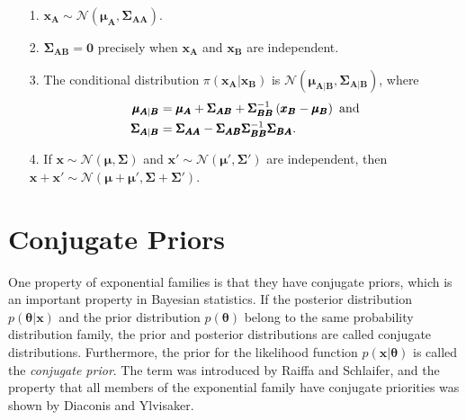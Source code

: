 \documentclass[12pt]{book}
\begin{document}
\begin{itemize}
    \item[1.] $\pmb{x}_{\pmb{A}}\sim\mathcal{N}\left(\pmb{\mu}_{\pmb{A}}, \pmb{\Sigma}_{\pmb{AA}}\right)$.
    \item[2.] $\pmb{\Sigma}_{\pmb{AB}}=\pmb{0}$ precisely when $\pmb{x}_{\pmb{A}}$ and $\pmb{x}_{\pmb{B}}$ are independent.
    \item[3.] The conditional distribution $\pi\left(\pmb{x}_{\pmb{A}}|\pmb{x}_{\pmb{B}}\right)$ is $\mathcal{N}\left(\pmb{\mu}_{\pmb{A}|\pmb{B}}, \pmb{\Sigma}_{\pmb{A}|\pmb{B}}\right)$, where
    \begin{align*}
        \pmb{\mu}_{\pmb{A}|\pmb{B}} &= \pmb{\mu}_{\pmb{A}}+\pmb{\Sigma}_{\pmb{AB}}+\pmb{\Sigma}_{\pmb{BB}}^{-1}\left(\pmb{x}_{\pmb{B}}-\pmb{\mu}_{\pmb{B}}\right) \hbox{ and} \\
        \pmb{\Sigma}_{\pmb{A}|\pmb{B}} &= \pmb{\Sigma}_{\pmb{AA}}-\pmb{\Sigma}_{\pmb{AB}}\pmb{\Sigma}_{\pmb{BB}}^{-1}\pmb{\Sigma}_{\pmb{BA}}.
    \end{align*}
    \item[4.] If $\pmb{x}\sim\mathcal{N}\left(\pmb{\mu}, \pmb{\Sigma}\right)$ and $\pmb{x}'\sim\mathcal{N}\left(\pmb{\mu'}, \pmb{\Sigma'}\right)$ are independent, then $\pmb{x}+\pmb{x'}\sim\mathcal{N}\left(\pmb{\mu}+ \pmb{\mu'}, \pmb{\Sigma}+ \pmb{\Sigma'}\right)$\autocite[Cf.][]{rue2005gaussian}.
\end{itemize}
\section{Conjugate Priors}
One property of exponential families is that they have conjugate priors, which is an important property in Bayesian statistics. If the posterior distribution $p\left(\pmb{\theta}|\pmb{x}\right)$ and the prior distribution $p\left(\pmb{\theta}\right)$ belong to the same probability distribution family, the prior and posterior distributions are called conjugate distributions. Furthermore, the prior for the likelihood function $p\left(\pmb{x}|\pmb{\theta}\right)$ is called the \textit{conjugate prior}. The term was introduced by Raiffa and Schlaifer\autocite[Cf.][]{raiffaapplied}, and the property that all members of the exponential family have conjugate priorities was shown by Diaconis and Ylvisaker\autocite[Cf.][]{diaconis1979conjugate}.
\end{document}
